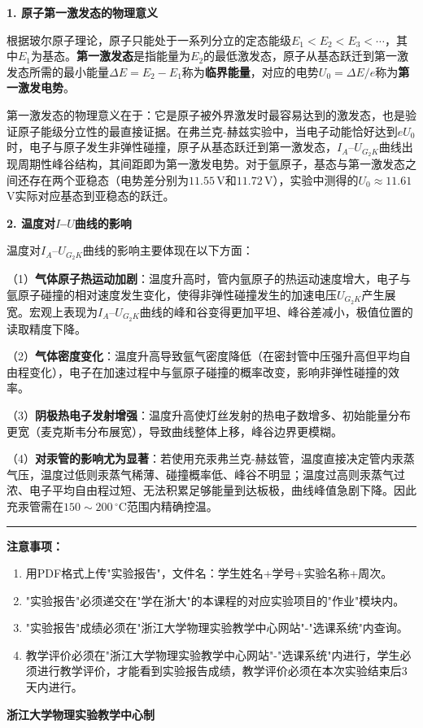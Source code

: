 \documentclass[a4paper,12pt]{article}
\begin{document}
{\fontsize{12pt}{18pt}\selectfont

\textbf{1. 原子第一激发态的物理意义}

根据玻尔原子理论，原子只能处于一系列分立的定态能级$E_1 < E_2 < E_3 < \cdots$，其中$E_1$为基态。\textbf{第一激发态}是指能量为$E_2$的最低激发态，原子从基态跃迁到第一激发态所需的最小能量$\Delta E = E_2 - E_1$称为\textbf{临界能量}，对应的电势$U_0 = \Delta E / e$称为\textbf{第一激发电势}。

第一激发态的物理意义在于：它是原子被外界激发时最容易达到的激发态，也是验证原子能级分立性的最直接证据。在弗兰克-赫兹实验中，当电子动能恰好达到$eU_0$时，电子与原子发生非弹性碰撞，原子从基态跃迁到第一激发态，$I_A$--$U_{G_2K}$曲线出现周期性峰谷结构，其间距即为第一激发电势。对于氩原子，基态与第一激发态之间还存在两个亚稳态（电势差分别为$11.55$\,V和$11.72$\,V），实验中测得的$U_0 \approx 11.61$\,V实际对应基态到亚稳态的跃迁。

\vspace{0.5cm}

\textbf{2. 温度对$I$--$U$曲线的影响}

温度对$I_A$--$U_{G_2K}$曲线的影响主要体现在以下方面：

（1）\textbf{气体原子热运动加剧}：温度升高时，管内氩原子的热运动速度增大，电子与氩原子碰撞的相对速度发生变化，使得非弹性碰撞发生的加速电压$U_{G_2K}$产生展宽。宏观上表现为$I_A$--$U_{G_2K}$曲线的峰和谷变得更加平坦、峰谷差减小，极值位置的读取精度下降。

（2）\textbf{气体密度变化}：温度升高导致氩气密度降低（在密封管中压强升高但平均自由程变化），电子在加速过程中与氩原子碰撞的概率改变，影响非弹性碰撞的效率。

（3）\textbf{阴极热电子发射增强}：温度升高使灯丝发射的热电子数增多、初始能量分布更宽（麦克斯韦分布展宽），导致曲线整体上移，峰谷边界更模糊。

（4）\textbf{对汞管的影响尤为显著}：若使用充汞弗兰克-赫兹管，温度直接决定管内汞蒸气压，温度过低则汞蒸气稀薄、碰撞概率低、峰谷不明显；温度过高则汞蒸气过浓、电子平均自由程过短、无法积累足够能量到达板极，曲线峰值急剧下降。因此充汞管需在$150\sim200\,^\circ$C范围内精确控温。

}

\vfill

\noindent\rule{\textwidth}{0.4pt}

{\fontsize{12pt}{18pt}\selectfont
\textbf{注意事项：}
\begin{enumerate}[label=\arabic*., leftmargin=2em, nosep]
    \item 用PDF格式上传"实验报告"，文件名：学生姓名+学号+实验名称+周次。
    \item "实验报告"必须递交在"学在浙大"的本课程的对应实验项目的"作业"模块内。
    \item "实验报告"成绩必须在"浙江大学物理实验教学中心网站"-"选课系统"内查询。
    \item 教学评价必须在"浙江大学物理实验教学中心网站"-"选课系统"内进行，学生必须进行教学评价，才能看到实验报告成绩，教学评价必须在本次实验结束后3天内进行。
\end{enumerate}
}

\vspace{0.5cm}
\begin{center}
    {\fontsize{12pt}{18pt}\selectfont \textbf{浙江大学物理实验教学中心制}}
\end{center}
\end{document}
